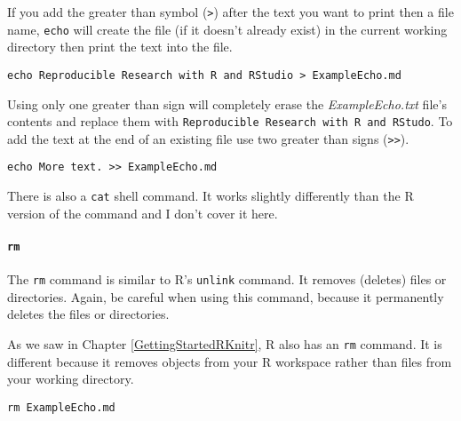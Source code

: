 \noindent If you add the greater than symbol (\verb|>|) after the text you want to print then a file name, \texttt{echo} will create the file (if it doesn't already exist) in the current working directory then print the text into the file.

\begin{knitrout}
\color{fgcolor}\begin{kframe}
\begin{verbatim}
echo Reproducible Research with R and RStudio > ExampleEcho.md
\end{verbatim}
\end{kframe}
\end{knitrout}


\noindent Using only one greater than sign will completely erase the \emph{ExampleEcho.txt} file's contents and replace them with \texttt{Reproducible Research with R and RStudo}. To add the text at the end of an existing file use two greater than signs (\verb|>>|).

\begin{knitrout}
\color{fgcolor}\begin{kframe}
\begin{verbatim}
echo More text. >> ExampleEcho.md
\end{verbatim}
\end{kframe}
\end{knitrout}


There is also a \texttt{cat} shell command. It works slightly differently than the R version of the command and I don't cover it here.

\paragraph{{\tt{rm}}}

The {\tt{rm}} command is similar to R's {\tt{unlink}} command. It removes (deletes) files or directories. Again, be careful when using this command, because it permanently deletes the files or directories.

As we saw in Chapter \ref{GettingStartedRKnitr}, R also has an \texttt{rm} command. It is different because it removes objects from your R workspace rather than files from your working directory.

\begin{knitrout}
\color{fgcolor}\begin{kframe}
\begin{verbatim}
rm ExampleEcho.md
\end{verbatim}
\end{kframe}
\end{knitrout}


